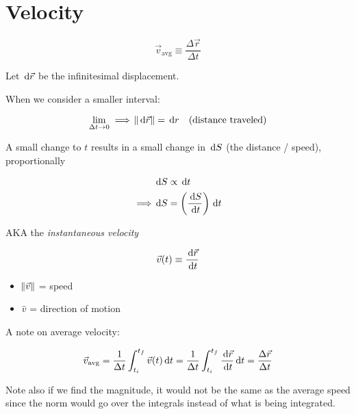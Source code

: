 \section{Velocity}

\begin{definition}
	\begin{equation}
		\vec v_{\mathrm{avg}} \equiv \frac{\Delta \vec r}{\Delta t}
	\end{equation}
\end{definition}

Let $\D \vec r$ be the infinitesimal displacement.

When we consider a smaller interval:

\begin{equation}
	\lim_{\Delta t \to 0} \implies \norm{\D \vec r} = \D r \quad \text{(distance traveled)}
\end{equation}

A small change to $t$ results in a small change in $\D S$ (the distance / speed), proportionally

\begin{align}
	&\D S \propto \D t\\
	\implies &\D S = \left(\frac{\D S}{\D t}\right) \D t
\end{align}

\begin{definition}[Velocity]
	AKA the \textit{instantaneous velocity}

	\begin{equation}
		\vec v (t) \equiv \frac{\D \vec r}{\D t}
	\end{equation}

	\begin{itemize}
		\item $\norm{\vec v}$ = speed
		\item $\hat v$ = direction of motion
	\end{itemize}
\end{definition}

\begin{remark}
	A note on average velocity:

	\begin{equation}
		\vec v_{\mathrm{avg}} = \frac{1}{\Delta t} \int_{t_i}^{t_f} \vec v(t) \D t = \frac{1}{\Delta t} \int_{t_i}^{t_f} \frac{\D \vec r}{\D t} \D t = \frac{\Delta \vec r}{\Delta t}
	\end{equation}

	Note also if we find the magnitude, it would not be the same as the average speed since the norm would go over the integrals instead of what is being integrated.
\end{remark}


